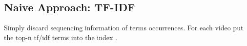 \subsection{Naive Approach: TF-IDF}
\label{sec:tfidf}

Simply discard sequencing information of terms occurrences. For each
video put the top-n tf/idf terms into the index \cite{mann2008}.
